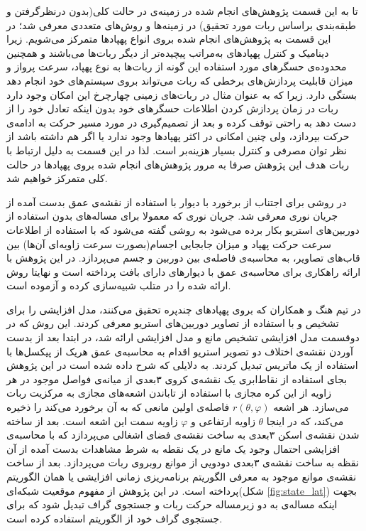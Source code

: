 تا به این قسمت پژوهش‌های انجام شده در زمینه‌ی  در حالت کلی(بدون درنظرگرفتن و طبقه‌بندی براساس ربات مورد تحقیق) در زمینه‌ها و روش‌های متعددی معرفی شد؛ در این قسمت به پژوهش‌های انجام شده بروی انواع پهپادها متمرکز می‌شویم. زیرا دینامیک و کنترل پهپادهای به‌مراتب پیچیده‌تر از دیگر ربات‌ها می‌باشند و همچنین محدوده‌ی حسگرهای مورد استفاده این گونه از ربات‌ها به نوع پهپاد، سرعت پرواز و میزان قابلیت پردازش‌های برخطی که ربات می‌تواند بروی سیستم‌های خود انجام دهد بستگی دارد. زیرا که به عنوان مثال در ربات‌های زمینی چهارچرخ این امکان وجود دارد ربات در زمان پردازش کردن اطلاعات حسگرهای خود بدون اینکه تعادل خود را از دست دهد به راحتی توقف کرده و بعد از تصمیم‌گیری در مورد مسیر حرکت به ادامه‌ی حرکت بپردازد، ولی چنین امکانی در اکثر پهپادها وجود ندارد یا اگر هم داشته باشد از نظر توان مصرفی و کنترل بسیار هزینه‌بر است. لذا در این قسمت به دلیل ارتباط با ربات هدف این پژوهش صرفا به مرور پژوهش‌های انجام شده بروی پهپادها در حالت کلی متمرکز خواهیم شد.

در  روشی برای اجتناب از برخورد با دیوار با استفاده از نقشه‌ی عمق بدست آمده از جریان نوری معرفی شد. جریان نوری که معمولا برای مساله‌های  بدون استفاده از دوربین‌های استریو بکار برده می‌شود به روشی گفته می‌شود که با استفاده از اطلاعات سرعت حرکت پهپاد و میزان جابجایی اجسام(بصورت سرعت زاویه‌ای آن‌ها) بین قاب‌های تصاویر، به محاسبه‌ی فاصله‌ی بین دوربین و جسم می‌پردازد. در این پژوهش با ارائه راهکاری برای محاسبه‌ی عمق با دیوارهای دارای بافت پرداخته است و نهایتا روش ارائه شده را در متلب شبیه‌سازی کرده و آزموده است.

در  تیم هنگ و همکاران که بروی پهپادهای چندپره تحقیق می‌کنند، مدل افزایشی را برای تشخیص و  با استفاده از تصاویر دوربین‌های استریو معرفی کردند. این روش که در دوقسمت مدل افزایشی تشخیص مانع و مدل افزایشی  ارائه شد، در ابتدا بعد از بدست آوردن نقشه‌ی اختلاف دو تصویر استریو اقدام به محاسبه‌ی عمق هریک از پیکسل‌ها با استفاده از یک ماتریس تبدیل کردند. به دلایلی که شرح داده شده است در این پژوهش بجای استفاده از نقاط‌ابری یک نقشه‌ی کروی ۳بعدی از میانه‌ی فواصل موجود در هر زاویه‌ از این کره مجازی با استفاده از تاباندن اشعه‌های مجازی به مرکزیت ربات می‌سازد. هر اشعه $r(\theta, \varphi)$ فاصله‌ی اولین مانعی که به آن برخورد می‌کند را ذخیره می‌کند، که در اینجا $\theta$ زاویه ارتفاعی و $\varphi$ زاویه سمت این اشعه است. بعد از ساخته شدن نقشه‌ی اسکن ۳بعدی به ساخت نقشه‌ی فضای اشغالی می‌پردازد که با محاسبه‌ی افزایشی احتمال وجود یک مانع در یک نقطه به شرط مشاهدات بدست آمده از آن نقظه به ساخت نقشه‌ی ۳بعدی دودویی از موانع روبروی ربات می‌پردازد. بعد از ساخت نقشه‌ی موانع موجود به معرفی الگوریتم برنامه‌ریزی زمانی افزایشی یا همان الگوریتم  پرداخته است. در این پژوهش از مفهوم موقعیت شبکه‌ای(شکل \ref{fig:state_lat}) بجهت اینکه مساله‌ی  به دو زیرمساله حرکت ربات و جستجوی گراف تبدیل شود که برای جستجوی گراف خود از الگوریتم  استفاده کرده است.

